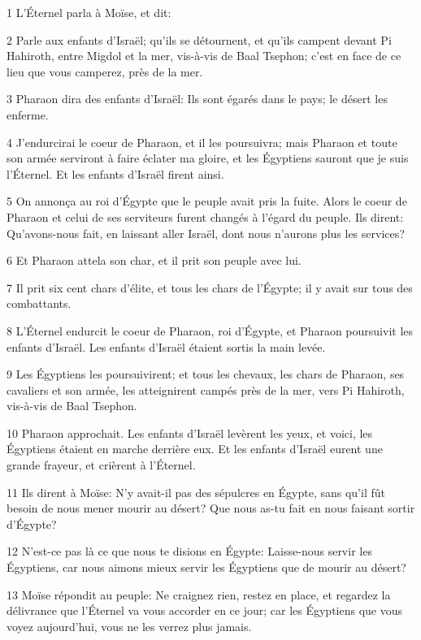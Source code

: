 \par 1 L'Éternel parla à Moïse, et dit:
\par 2 Parle aux enfants d'Israël; qu'ils se détournent, et qu'ils campent devant Pi Hahiroth, entre Migdol et la mer, vis-à-vis de Baal Tsephon; c'est en face de ce lieu que vous camperez, près de la mer.
\par 3 Pharaon dira des enfants d'Israël: Ils sont égarés dans le pays; le désert les enferme.
\par 4 J'endurcirai le coeur de Pharaon, et il les poursuivra; mais Pharaon et toute son armée serviront à faire éclater ma gloire, et les Égyptiens sauront que je suis l'Éternel. Et les enfants d'Israël firent ainsi.
\par 5 On annonça au roi d'Égypte que le peuple avait pris la fuite. Alors le coeur de Pharaon et celui de ses serviteurs furent changés à l'égard du peuple. Ils dirent: Qu'avons-nous fait, en laissant aller Israël, dont nous n'aurons plus les services?
\par 6 Et Pharaon attela son char, et il prit son peuple avec lui.
\par 7 Il prit six cent chars d'élite, et tous les chars de l'Égypte; il y avait sur tous des combattants.
\par 8 L'Éternel endurcit le coeur de Pharaon, roi d'Égypte, et Pharaon poursuivit les enfants d'Israël. Les enfants d'Israël étaient sortis la main levée.
\par 9 Les Égyptiens les poursuivirent; et tous les chevaux, les chars de Pharaon, ses cavaliers et son armée, les atteignirent campés près de la mer, vers Pi Hahiroth, vis-à-vis de Baal Tsephon.
\par 10 Pharaon approchait. Les enfants d'Israël levèrent les yeux, et voici, les Égyptiens étaient en marche derrière eux. Et les enfants d'Israël eurent une grande frayeur, et crièrent à l'Éternel.
\par 11 Ils dirent à Moïse: N'y avait-il pas des sépulcres en Égypte, sans qu'il fût besoin de nous mener mourir au désert? Que nous as-tu fait en nous faisant sortir d'Égypte?
\par 12 N'est-ce pas là ce que nous te disions en Égypte: Laisse-nous servir les Égyptiens, car nous aimons mieux servir les Égyptiens que de mourir au désert?
\par 13 Moïse répondit au peuple: Ne craignez rien, restez en place, et regardez la délivrance que l'Éternel va vous accorder en ce jour; car les Égyptiens que vous voyez aujourd'hui, vous ne les verrez plus jamais.
